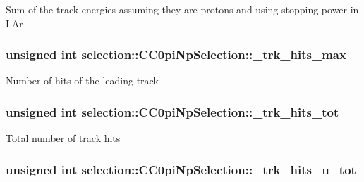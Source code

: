 Sum of the track energies assuming they are protons and using stopping power in L\-Ar \hypertarget{classselection_1_1CC0piNpSelection_a247d186cb641d28f8ea5b02c4f2a39bc}{
\subsubsection[{\-\_\-trk\-\_\-hits\-\_\-max}]{\setlength{\rightskip}{0pt plus 5cm}unsigned int selection\-::\-C\-C0pi\-Np\-Selection\-::\-\_\-trk\-\_\-hits\-\_\-max\hspace{0.3cm}{\ttfamily [private]}}}\label{classselection_1_1CC0piNpSelection_a247d186cb641d28f8ea5b02c4f2a39bc}
Number of hits of the leading track \hypertarget{classselection_1_1CC0piNpSelection_a420b9962478d7998282e03f1ccf89c2e}{
\subsubsection[{\-\_\-trk\-\_\-hits\-\_\-tot}]{\setlength{\rightskip}{0pt plus 5cm}unsigned int selection\-::\-C\-C0pi\-Np\-Selection\-::\-\_\-trk\-\_\-hits\-\_\-tot\hspace{0.3cm}{\ttfamily [private]}}}\label{classselection_1_1CC0piNpSelection_a420b9962478d7998282e03f1ccf89c2e}
Total number of track hits \hypertarget{classselection_1_1CC0piNpSelection_af7d0e867df8901ff3e531b4c1b96408a}{
\subsubsection[{\-\_\-trk\-\_\-hits\-\_\-u\-\_\-tot}]{\setlength{\rightskip}{0pt plus 5cm}unsigned int selection\-::\-C\-C0pi\-Np\-Selection\-::\-\_\-trk\-\_\-hits\-\_\-u\-\_\-tot\hspace{0.3cm}{\ttfamily [private]}}}\label{classselection_1_1CC0piNpSelection_af7d0e867df8901ff3e531b4c1b96408a}
